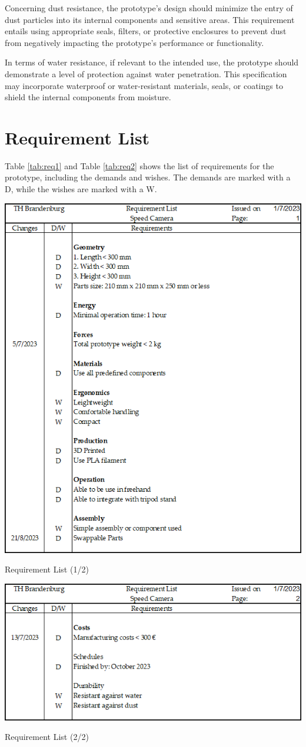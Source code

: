 Concerning dust resistance, the prototype's design should minimize the entry of dust particles into its internal components and sensitive areas. This requirement entails using appropriate seals, filters, or protective enclosures to prevent dust from negatively impacting the prototype's performance or functionality.

In terms of water resistance, if relevant to the intended use, the prototype should demonstrate a level of protection against water penetration. This specification may incorporate waterproof or water-resistant materials, seals, or coatings to shield the internal components from moisture.

\section{Requirement List}
Table \ref{tab:req1} and Table \ref{tab:req2} shows the list of requirements for the prototype, including the demands and wishes. The demands are marked with a D, while the wishes are marked with a W.

\begin{table}[H]
    \centering
    \includegraphics[width= 0.9\linewidth]{texs/Part1/chapter2/image/req1.png}
    \caption{Requirement List (1/2)}
    \label{tab:req1}
\end{table}

\begin{table}[H]
    \centering
    \includegraphics[width= 0.9\linewidth]{texs/Part1/chapter2/image/req2.png}
    \caption{Requirement List (2/2)}
    \label{tab:req2}
\end{table}
